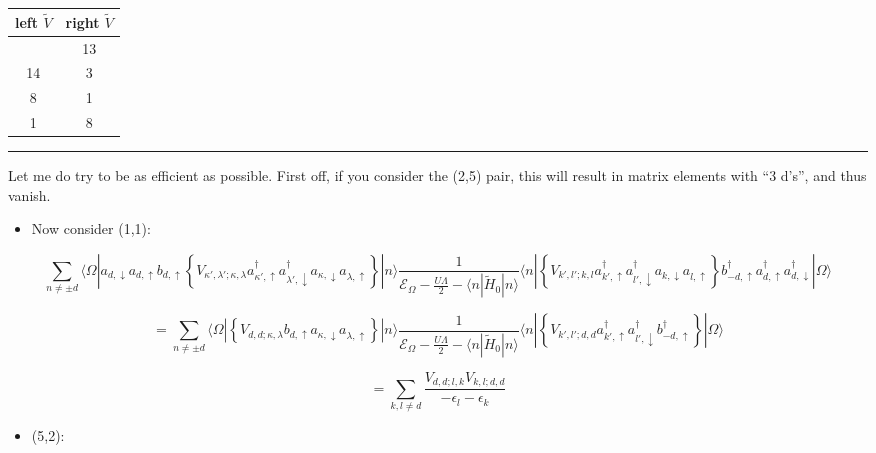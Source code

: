 \documentclass[
  letterpaper,
  DIV=11,
  numbers=noendperiod]{scrartcl}
\newcounter{none} %
\providecommand{\tightlist}{%
  \setlength{\itemsep}{0pt}\setlength{\parskip}{0pt}}
\begin{document}
{\def\LTcaptype{none} %
\begin{longtable}[]{@{}cc@{}}
\toprule\noalign{}
left \(\tilde V\) & right \(\tilde V\) \\
\midrule\noalign{}
\endhead
\bottomrule\noalign{}
\endlastfoot
4 & 13 \\
14 & 3 \\
8 & 1 \\
1 & 8 \\
\end{longtable}
}

\begin{center}\rule{0.5\linewidth}{0.5pt}\end{center}

Let me do try to be as efficient as possible. First off, if you consider
the (2,5) pair, this will result in matrix elements with ``3 d's'', and
thus vanish.

\begin{itemize}
\tightlist
\item
  Now consider (1,1):
\end{itemize}

\begin{equation}
\sum_{n\ne \pm d}\langle\Omega|a_{d,\downarrow}a_{d,\uparrow}b_{d,\uparrow}
\left\{
V_{\kappa',\lambda';\kappa,\lambda}a^\dagger_{\kappa',\uparrow}a^\dagger_{\lambda',\downarrow}a^{}_{\kappa,\downarrow}a^{}_{\lambda,\uparrow}
\right\}
|n\rangle\frac{1}{\mathcal{E}_\Omega-\frac{U\Lambda}{2}-\langle n|\tilde H_0|n\rangle}\langle n|\left\{
V_{k',l';k,l}a^\dagger_{k',\uparrow}a^\dagger_{l',\downarrow}a^{}_{k,\downarrow}a^{}_{l,\uparrow}
\right\}
b^\dagger_{-d,\uparrow}a^\dagger_{d,\uparrow}a^\dagger_{d,\downarrow}|\Omega\rangle
\end{equation}

\begin{equation}
=\sum_{n\ne \pm d}\langle\Omega|
\left\{
V_{d,d;\kappa,\lambda}b_{d,\uparrow}a^{}_{\kappa,\downarrow}a^{}_{\lambda,\uparrow}
\right\}
|n\rangle\frac{1}{\mathcal{E}_\Omega-\frac{U\Lambda}{2}-\langle n|\tilde H_0|n\rangle}\langle n|\left\{
V_{k',l';d,d}a^\dagger_{k',\uparrow}a^\dagger_{l',\downarrow}b^\dagger_{-d,\uparrow}
\right\}
|\Omega\rangle
\end{equation}

\begin{equation}
=\sum_{k,l\ne d}\frac{V_{d,d;l,k}V_{k,l;d,d}}{-\epsilon_{l}-\epsilon_{k}}
\end{equation}

\begin{itemize}
\tightlist
\item
  (5,2):
\end{itemize}
\end{document}
